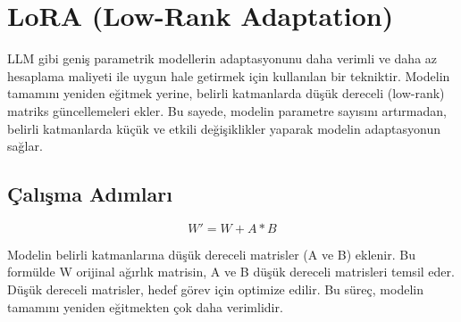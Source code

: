\section{LoRA (Low-Rank Adaptation)}

LLM gibi geniş parametrik modellerin adaptasyonunu daha verimli ve daha az hesaplama maliyeti ile uygun hale getirmek için kullanılan bir tekniktir. Modelin tamamını yeniden eğitmek yerine, belirli katmanlarda düşük dereceli (low-rank) matriks güncellemeleri ekler. Bu sayede, modelin parametre sayısını artırmadan, belirli katmanlarda küçük ve etkili değişiklikler yaparak modelin adaptasyonun sağlar.

\subsection{Çalışma Adımları}

\[
W' = W + A * B
\]

Modelin belirli katmanlarına düşük dereceli matrisler (A ve B) eklenir. Bu formülde W orijinal ağırlık matrisin, A ve B düşük dereceli matrisleri temsil eder. Düşük dereceli matrisler, hedef görev için optimize edilir. Bu süreç, modelin tamamını yeniden eğitmekten çok daha verimlidir.




\newpage